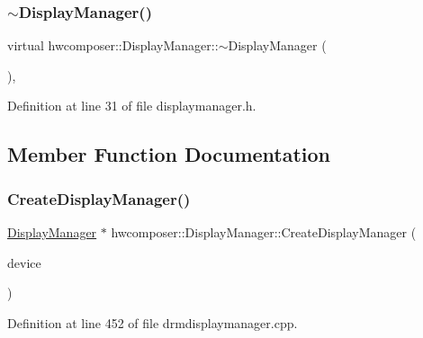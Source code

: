 \subsubsection{\texorpdfstring{$\sim$\+Display\+Manager()}{~DisplayManager()}}
{\footnotesize\ttfamily virtual hwcomposer\+::\+Display\+Manager\+::$\sim$\+Display\+Manager (\begin{DoxyParamCaption}{ }\end{DoxyParamCaption})\hspace{0.3cm}{\ttfamily [inline]}, {\ttfamily [virtual]}}



Definition at line 31 of file displaymanager.\+h.


\begin{DoxyCode}{0}
\end{DoxyCode}


\subsection{Member Function Documentation}
\mbox{\label{classhwcomposer_1_1DisplayManager_aed4adf531c3ea168ff4e2f7c82fd1cbb}} 
\subsubsection{\texorpdfstring{Create\+Display\+Manager()}{CreateDisplayManager()}}
{\footnotesize\ttfamily \mbox{\hyperlink{classhwcomposer_1_1DisplayManager}{Display\+Manager}} $\ast$ hwcomposer\+::\+Display\+Manager\+::\+Create\+Display\+Manager (\begin{DoxyParamCaption}\item[{\mbox{\hyperlink{classhwcomposer_1_1GpuDevice}{Gpu\+Device}} $\ast$}]{device }\end{DoxyParamCaption})\hspace{0.3cm}{\ttfamily [static]}}



Definition at line 452 of file drmdisplaymanager.\+cpp.


\begin{DoxyCode}{0}
\end{DoxyCode}
\mbox{\label{classhwcomposer_1_1DisplayManager_a678df886d9faff854111d8ace155befc}} 
